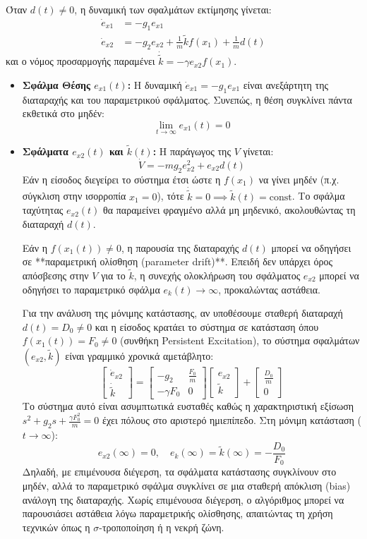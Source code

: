 \documentclass[a4paper,11pt]{article}
\begin{document}
\begin{answer}
Όταν $d(t) \ne 0$, η δυναμική των σφαλμάτων εκτίμησης γίνεται:
\begin{align*}
    \dot{e}_{x1} &= -g_1 e_{x1} \\
    \dot{e}_{x2} &= -g_2 e_{x2} + \frac{1}{m} \tilde{k} f(x_1) + \frac{1}{m} d(t)
\end{align*}
και ο νόμος προσαρμογής παραμένει $\dot{\tilde{k}} = -\gamma e_{x2} f(x_1)$.
\begin{itemize}
    \item \textbf{Σφάλμα Θέσης $e_{x1}(t)$:} Η δυναμική $\dot{e}_{x1} = -g_1 e_{x1}$ είναι ανεξάρτητη της διαταραχής και του παραμετρικού σφάλματος. Συνεπώς, η θέση συγκλίνει πάντα εκθετικά στο μηδέν:
    \[ \lim_{t \to \infty} e_{x1}(t) = 0 \]
    \item \textbf{Σφάλματα $e_{x2}(t)$ και $\tilde{k}(t)$:} 
    Η παράγωγος της $V$ γίνεται:
    \[ \dot{V} = -m g_2 e_{x2}^2 + e_{x2} d(t) \]
    Εάν η είσοδος διεγείρει το σύστημα έτσι ώστε η $f(x_1)$ να γίνει μηδέν (π.χ. σύγκλιση στην ισορροπία $x_1 = 0$), τότε $\dot{\tilde{k}} = 0 \implies \tilde{k}(t) = \text{const}$. Το σφάλμα ταχύτητας $e_{x2}(t)$ θα παραμείνει φραγμένο αλλά μη μηδενικό, ακολουθώντας τη διαταραχή $d(t)$.
    
    Εάν η $f(x_1(t)) \ne 0$, η παρουσία της διαταραχής $d(t)$ μπορεί να οδηγήσει σε **παραμετρική ολίσθηση (parameter drift)**. Επειδή δεν υπάρχει όρος απόσβεσης στην $V$ για το $\tilde{k}$, η συνεχής ολοκλήρωση του σφάλματος $e_{x2}$ μπορεί να οδηγήσει το παραμετρικό σφάλμα $e_k(t) \to \infty$, προκαλώντας αστάθεια.
    
    Για την ανάλυση της μόνιμης κατάστασης, αν υποθέσουμε σταθερή διαταραχή $d(t) = D_0 \ne 0$ και η είσοδος κρατάει το σύστημα σε κατάσταση όπου $f(x_1(t)) = F_0 \ne 0$ (συνθήκη Persistent Excitation), το σύστημα σφαλμάτων $(e_{x2}, \tilde{k})$ είναι γραμμικό χρονικά αμετάβλητο:
    \[ \begin{bmatrix} \dot{e}_{x2} \\ \dot{\tilde{k}} \end{bmatrix} = \begin{bmatrix} -g_2 & \frac{F_0}{m} \\ -\gamma F_0 & 0 \end{bmatrix} \begin{bmatrix} e_{x2} \\ \tilde{k} \end{bmatrix} + \begin{bmatrix} \frac{D_0}{m} \\ 0 \end{bmatrix} \]
    Το σύστημα αυτό είναι ασυμπτωτικά ευσταθές καθώς η χαρακτηριστική εξίσωση $s^2 + g_2 s + \frac{\gamma F_0^2}{m} = 0$ έχει πόλους στο αριστερό ημιεπίπεδο. Στη μόνιμη κατάσταση ($t \to \infty$):
    \[ e_{x2}(\infty) = 0, \quad e_k(\infty) = \tilde{k}(\infty) = -\frac{D_0}{F_0} \]
    Δηλαδή, με επιμένουσα διέγερση, τα σφάλματα κατάστασης συγκλίνουν στο μηδέν, αλλά το παραμετρικό σφάλμα συγκλίνει σε μια σταθερή απόκλιση (bias) ανάλογη της διαταραχής. Χωρίς επιμένουσα διέγερση, ο αλγόριθμος μπορεί να παρουσιάσει αστάθεια λόγω παραμετρικής ολίσθησης, απαιτώντας τη χρήση τεχνικών όπως η $\sigma$-τροποποίηση ή η νεκρή ζώνη.
\end{itemize}
\end{answer}
\end{document}
